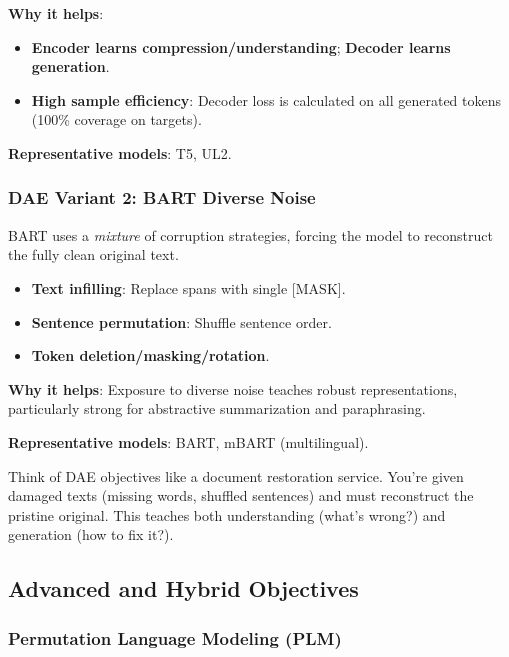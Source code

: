 \documentclass{article}
\begin{document}
\textbf{Why it helps}:

\begin{itemize}
\item \textbf{Encoder learns compression/understanding}; \textbf{Decoder learns generation}.
\item \textbf{High sample efficiency}: Decoder loss is calculated on all generated tokens (100\% coverage on targets).
\end{itemize}

\textbf{Representative models}: T5, UL2.

\subsubsection{DAE Variant 2: BART Diverse Noise}

BART uses a \textit{mixture} of corruption strategies, forcing the model to reconstruct the fully clean original text.

\begin{itemize}
\item \textbf{Text infilling}: Replace spans with single [MASK].
\item \textbf{Sentence permutation}: Shuffle sentence order.
\item \textbf{Token deletion/masking/rotation}.
\end{itemize}

\textbf{Why it helps}: Exposure to diverse noise teaches robust representations, particularly strong for abstractive summarization and paraphrasing.

\textbf{Representative models}: BART, mBART (multilingual).

\begin{tcolorbox}[colback=green!5!white, colframe=green!50!black, title=Intuition: The Document Repair Shop]
Think of DAE objectives like a document restoration service. You're given damaged texts (missing words, shuffled sentences) and must reconstruct the pristine original. This teaches both understanding (what's wrong?) and generation (how to fix it?).
\end{tcolorbox}

\subsection{Advanced and Hybrid Objectives}

\subsubsection{Permutation Language Modeling (PLM)}
\end{document}

